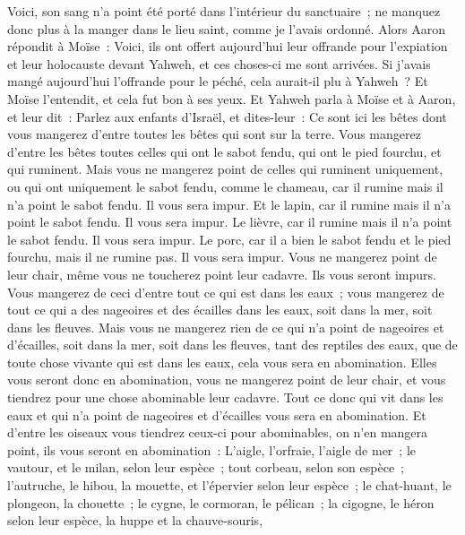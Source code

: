 \begin{multicols}{2}
Voici, son sang n'a point été porté dans l'intérieur du sanctuaire~; ne manquez donc plus à la manger dans le lieu saint, comme je l'avais ordonné.
Alors Aaron répondit à Moïse~: Voici, ils ont offert aujourd'hui leur offrande pour l'expiation et leur holocauste devant Yahweh, et ces choses-ci me sont arrivées. Si j'avais mangé aujourd'hui l'offrande pour le péché, cela aurait-il plu à Yahweh~?
Et Moïse l'entendit, et cela fut bon à ses yeux.
\VerseOne{}Et Yahweh parla à Moïse et à Aaron, et leur dit~:
Parlez aux enfants d'Israël, et dites-leur~: Ce sont ici les bêtes dont vous mangerez d'entre toutes les bêtes qui sont sur la terre.
Vous mangerez d'entre les bêtes toutes celles qui ont le sabot fendu, qui ont le pied fourchu, et qui ruminent.
Mais vous ne mangerez point de celles qui ruminent uniquement, ou qui ont uniquement le sabot fendu, comme le chameau, car il rumine mais il n'a point le sabot fendu. Il vous sera impur.
Et le lapin, car il rumine mais il n'a point le sabot fendu. Il vous sera impur.
Le lièvre, car il rumine mais il n'a point le sabot fendu. Il vous sera impur.
Le porc, car il a bien le sabot fendu et le pied fourchu, mais il ne rumine pas. Il vous sera impur.
Vous ne mangerez point de leur chair, même vous ne toucherez point leur cadavre. Ils vous seront impurs.
Vous mangerez de ceci d'entre tout ce qui est dans les eaux~; vous mangerez de tout ce qui a des nageoires et des écailles dans les eaux, soit dans la mer, soit dans les fleuves.
Mais vous ne mangerez rien de ce qui n'a point de nageoires et d'écailles, soit dans la mer, soit dans les fleuves, tant des reptiles des eaux, que de toute chose vivante qui est dans les eaux, cela vous sera en abomination.
Elles vous seront donc en abomination, vous ne mangerez point de leur chair, et vous tiendrez pour une chose abominable leur cadavre.
Tout ce donc qui vit dans les eaux et qui n'a point de nageoires et d'écailles vous sera en abomination.
Et d'entre les oiseaux vous tiendrez ceux-ci pour abominables, on n'en mangera point, ils vous seront en abomination~: L'aigle, l'orfraie, l'aigle de mer~;
le vautour, et le milan, selon leur espèce~;
tout corbeau, selon son espèce~;
l'autruche, le hibou, la mouette, et l'épervier selon leur espèce~;
le chat-huant, le plongeon, la chouette~;
le cygne, le cormoran, le pélican~;
la cigogne, le héron selon leur espèce, la huppe et la chauve-souris,

\end{multicols}
